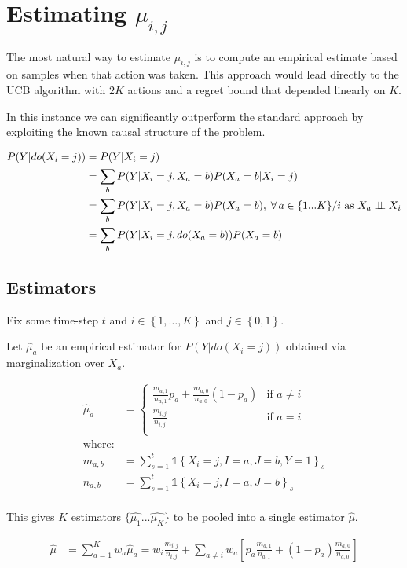 \documentclass{article}
\newcommand{\set}[1]{\left\{#1\right\}}
\newcommand{\ind}[1]{\mathds{1}\!\!\set{#1}}
\newcommand{\eq}[1]{\begin{align*}#1\end{align*}}
\theoremstyle{plain}
\theoremstyle{definition}
\begin{document}
\section{Estimating $\mu_{i,j}$}
The most natural way to estimate $\mu_{i,j}$ is to compute an empirical estimate based on samples when that action was taken. This approach would
lead directly to the UCB algorithm with $2K$ actions and a regret bound that depended linearly on $K$. 

In this instance we can significantly
outperform the standard approach by exploiting the known causal structure of the problem.

\eq {
P(Y|do(X_i=j)) &= P(Y|X_i = j)\\
 &= \sum_{b}P(Y|X_i = j,X_a = b)P(X_a = b|X_i = j) \\
 &= \sum_{b}P(Y|X_i = j,X_a = b)P(X_a = b), \; \forall \, a \in \{1...K\}/i \text{ as } X_a \ci X_i\\
 &= \sum_{b}P(Y|X_i = j,do(X_a = b))P(X_a = b) 
}


\subsection{Estimators}
\label{sec:estimators}
Fix some time-step $t$ and $i \in \set{1,\ldots,K}$ and $j \in \set{0,1}$. 

Let $\hat{\mu}_a$ be an empirical estimator for $P(Y|do(X_i=j))$ obtained via marginalization over $X_a$.

\eq {
\hat{\mu}_a &=
\begin{cases}
\frac{m_{a,1}}{n_{a,1}}p_a+\frac{m_{a,0}}{n_{a,0}}(1-p_a) & \text{if } a \neq{i} \\
\frac{m_{i,j}}{n_{i,j}} & \text{if } a=i \\
\end{cases}\\
\text{where:}\\
m_{a,b}    &= \sum_{s=1}^t \ind{X_i = j, I = a,J = b, Y = 1}_s \\
n_{a,b}    &= \sum_{s=1}^t \ind{X_i = j, I = a,J = b}_s \\
}



This gives $K$ estimators $\{\hat{\mu_1}...\hat{\mu_K}\}$ to be pooled into a single estimator $\hat{\mu}$.

\eq {
\hat{\mu} &= \sum^{K}_{a=1}w_a\hat{\mu}_a=w_i \frac{m_{i,j}}{n_{i,j}}+ \sum_{a \neq i} w_a \left[p_a \frac{m_{a,1}}{n_{a,1}} + (1 - p_a) \frac{m_{a,0}}{n_{a,0}}\right]\\
}
\end{document}

